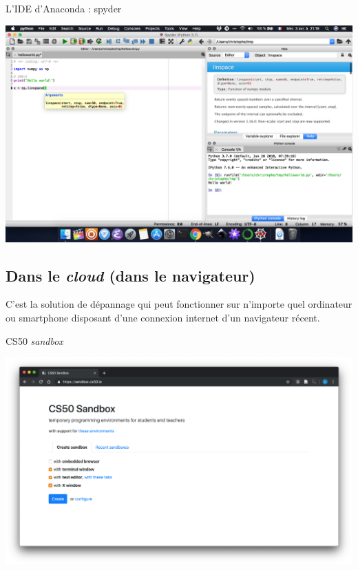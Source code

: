 \documentclass[10pt,aspectratio=169]{beamer}
\begin{document}
\begin{frame}{L'IDE d'Anaconda : spyder}
  \begin{center}
    \includegraphics[height = .8\textheight]{spyder-help-info-popup}
  \end{center}
\end{frame}

\subsection{Dans le \emph{cloud} (dans le navigateur)}

\begin{frame}
  \begin{Conseil}
    C'est la solution de dépannage qui peut fonctionner sur n'\alert{importe quel ordinateur} ou \alert{smartphone} disposant d'une connexion internet d'un navigateur \alert{récent}.
  \end{Conseil}
\end{frame}

\begin{frame}{CS50 \emph{sandbox}}
  \begin{center}
    \includegraphics[height = .8\textheight]{cs50-create-page}
  \end{center}
\end{frame}
\end{document}
